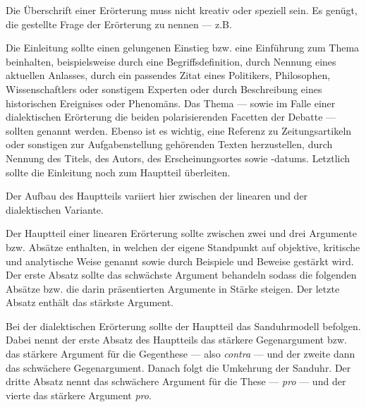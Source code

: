 \begin{enumerate}


	Die \"{U}berschrift einer Er\"{o}rterung muss nicht kreativ oder speziell sein. Es gen\"{u}gt, die gestellte Frage der Er\"{o}rterung zu nennen --- z.B. 


	Die Einleitung sollte einen gelungenen Einstieg bzw. eine Einf\"{u}hrung zum Thema beinhalten, beispielsweise durch eine Begriffsdefinition, durch Nennung eines aktuellen Anlasses, durch ein passendes Zitat eines Politikers, Philosophen, Wissenschaftlers oder sonstigem Experten oder durch Beschreibung eines historischen Ereignises oder Phenom\"{a}ns. Das Thema --- sowie im Falle einer dialektischen Er\"{o}rterung die beiden polarisierenden Facetten der Debatte --- sollten genannt werden. Ebenso ist es wichtig, eine Referenz zu Zeitungsartikeln oder sonstigen zur Aufgabenstellung geh\"{o}renden Texten herzustellen, durch Nennung des Titels, des Autors, des Erscheinungsortes sowie -datums. Letztlich sollte die Einleitung noch zum Hauptteil \"{u}berleiten.


	Der Aufbau des Hauptteils variiert hier zwischen der linearen und der dialektischen Variante. 

	\begin{itemize}


		Der Hauptteil einer linearen Er\"{o}rterung sollte zwischen zwei und drei Argumente bzw. Abs\"{a}tze enthalten, in welchen der eigene Standpunkt auf objektive, kritische und analytische Weise genannt sowie durch Beispiele und Beweise gest\"{a}rkt wird. Der erste Absatz sollte das schw\"{a}chste Argument behandeln sodass die folgenden Abs\"{a}tze bzw. die darin pr\"{a}sentierten Argumente in St\"{a}rke steigen. Der letzte Absatz enth\"{a}lt das st\"{a}rkste Argument.


		Bei der dialektischen Er\"{o}rterung sollte der Hauptteil das Sanduhrmodell befolgen. Dabei nennt der erste Absatz des Hauptteils das st\"{a}rkere Gegenargument bzw. das st\"{a}rkere Argument f\"{u}r die Gegenthese --- also \emph{contra} --- und der zweite dann das schw\"{a}chere Gegenargument. Danach folgt die Umkehrung der Sanduhr. Der dritte Absatz nennt das schw\"{a}chere Argument f\"{u}r die These --- \emph{pro} --- und der vierte das st\"{a}rkere Argument \emph{pro}.


\end{itemize}
\end{enumerate}
